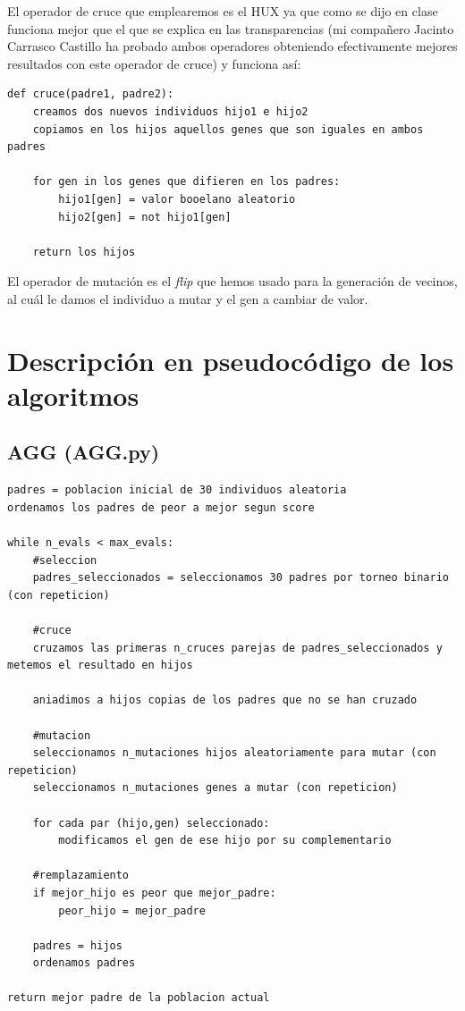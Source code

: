 \documentclass[10pt,a4paper]{article}
\begin{document}
El operador de cruce que emplearemos es el HUX ya que como se dijo en clase funciona mejor que el que se explica en las transparencias (mi compañero Jacinto Carrasco Castillo ha probado ambos operadores obteniendo efectivamente mejores resultados con este operador de cruce) y funciona así:\\

\begin{lstlisting}
def cruce(padre1, padre2):
	creamos dos nuevos individuos hijo1 e hijo2
	copiamos en los hijos aquellos genes que son iguales en ambos padres
	
	for gen in los genes que difieren en los padres:
		hijo1[gen] = valor booelano aleatorio
		hijo2[gen] = not hijo1[gen]
		
	return los hijos		
\end{lstlisting}

El operador de mutación es el \textit{flip} que hemos usado para la generación de vecinos, al cuál le damos el individuo a mutar y el gen a cambiar de valor.\\

\newpage

\section{\color[rgb]{0.0,0.0,0.21}Descripción en pseudocódigo de los algoritmos}
\subsection{\color[rgb]{0.0,0.0,0.51}AGG (AGG.py)}

\begin{lstlisting}
padres = poblacion inicial de 30 individuos aleatoria
ordenamos los padres de peor a mejor segun score

while n_evals < max_evals:
	#seleccion
	padres_seleccionados = seleccionamos 30 padres por torneo binario (con repeticion)
	
	#cruce
	cruzamos las primeras n_cruces parejas de padres_seleccionados y metemos el resultado en hijos
	
	aniadimos a hijos copias de los padres que no se han cruzado
	
	#mutacion
	seleccionamos n_mutaciones hijos aleatoriamente para mutar (con repeticion)
	seleccionamos n_mutaciones genes a mutar (con repeticion)
	
	for cada par (hijo,gen) seleccionado:
		modificamos el gen de ese hijo por su complementario
		
	#remplazamiento
	if mejor_hijo es peor que mejor_padre:
		peor_hijo = mejor_padre
		
	padres = hijos
	ordenamos padres
	
return mejor padre de la poblacion actual		
\end{lstlisting}
\end{document}
